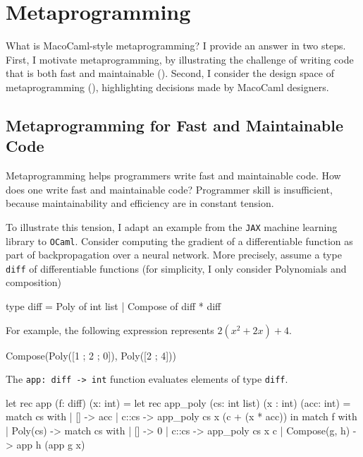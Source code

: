 \section{Metaprogramming}\label{section:metaprogramming-technical}
What is MacoCaml-style metaprogramming? I provide an answer in two steps. First, I motivate metaprogramming, by illustrating the challenge of writing code that is both fast and maintainable (). Second, I consider the design space of metaprogramming (), highlighting decisions made by MacoCaml designers.

\subsection{Metaprogramming for Fast and Maintainable Code}\label{subsection:metaprogramming-motivation}

Metaprogramming helps programmers write fast and maintainable code. How does one write fast and maintainable code? Programmer skill is insufficient, because maintainability and efficiency are in constant tension. 

To illustrate this tension, I adapt an example from the \texttt{JAX} machine learning library to \texttt{OCaml}. Consider computing the gradient of a differentiable function as part of backpropagation over a neural network. More precisely, assume a type \texttt{diff} of differentiable functions (for simplicity, I only consider Polynomials and composition)

\begin{ocaml}
type diff = Poly of int list 
          | Compose of diff * diff
\end{ocaml}
For example, the following expression represents $2(x^2 + 2x) + 4$. 
\begin{ocaml}
Compose(Poly([1 ; 2 ; 0]), Poly([2 ; 4]))
\end{ocaml}

The \texttt{app: diff -> int} function evaluates elements of type \texttt{diff}. 

\begin{ocaml}
let rec app (f: diff) (x: int) = 
  let rec app_poly (cs: int list) (x : int) (acc: int) = match cs with 
    | [] -> acc 
    | c::cs -> app_poly cs x (c + (x * acc)) 
  in match f with 
    | Poly(cs)      -> match cs with 
                      | [] -> 0
                      | c::cs -> app_poly cs x c
    | Compose(g, h) -> app h (app g x)
\end{ocaml}


